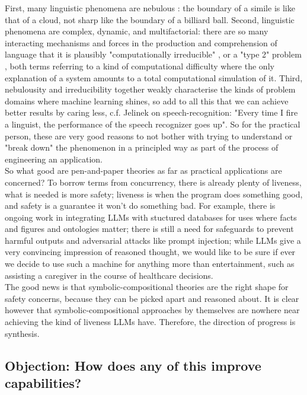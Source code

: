 First, many linguistic phenomena are nebulous \citep{chapman_david_nebulosity_2010}: the boundary of a simile is like that of a cloud, not sharp like the boundary of a billiard ball. Second, linguistic phenomena are complex, dynamic, and multifactorial: there are so many interacting mechanisms and forces in the production and comprehension of language that it is plausibly "computationally irreducible" \citep{wolfram_new_2002}, or a "type 2" problem \citep{marr_artificial_1977}, both terms referring to a kind of computational difficulty where the only explanation of a system amounts to a total computational simulation of it. Third, nebulousity and irreducibility together weakly characterise the kinds of problem domains where machine learning shines, so add to all this that we can achieve better results by caring less, c.f. Jelinek on speech-recognition: "Every time I fire a linguist, the performance of the speech recognizer goes up". So for the practical person, these are very good reasons to not bother with trying to understand or "break down" the phenomenon in a principled way as part of the process of engineering an application.\\

So what good are pen-and-paper theories as far as practical applications are concerned? To borrow terms from concurrency, there is already plenty of liveness, what is needed is more safety; liveness is when the program does something good, and safety is a guarantee it won't do something bad. For example, there is ongoing work in integrating LLMs with stuctured databases for uses where facts and figures and ontologies matter; there is still a need for safeguards to prevent harmful outputs and adversarial attacks like prompt injection; while LLMs give a very convincing impression of reasoned thought, we would like to be sure if ever we decide to use such a machine for anything more than entertainment, such as assisting a caregiver in the course of healthcare decisions.\\

The good news is that symbolic-compositional theories are the right shape for safety concerns, because they can be picked apart and reasoned about. It is clear however that symbolic-compositional approaches by themselves are nowhere near achieving the kind of liveness LLMs have. Therefore, the direction of progress is synthesis.



\subsection{\textbf{Objection:} How does any of this improve capabilities?}

